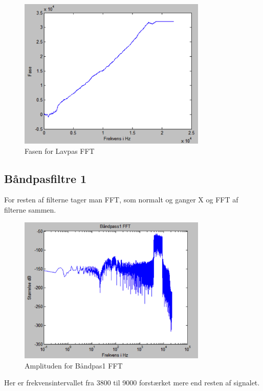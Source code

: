 \begin{figure}[H]
	\centering
	\includegraphics[width=0.8\textwidth]{Figur/Snip20151111_75}
	\caption{Fasen for Lavpas FFT}
\end{figure}

\subsection{Båndpasfiltre 1}
For resten af filterne tager man FFT, som normalt og ganger X og FFT af filterne sammen. 

\begin{figure}[H]
	\centering
	\includegraphics[width=0.8\textwidth]{Figur/Snip20151111_76}
	\caption{Amplituden for Båndpas1 FFT}
\end{figure}

Her er frekvensintervallet fra 3800 til 9000 forstærket mere end resten af signalet. 

